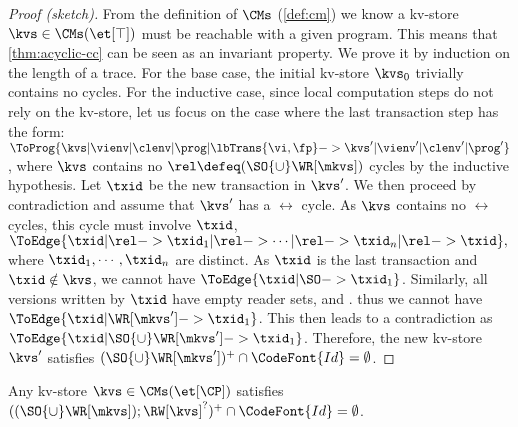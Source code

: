 \begin{proof}[Proof (sketch)]
From the definition of \( \CMs \) (\cref{def:cm})
we know a kv-store \( \kvs \in \CMs(\et[\top]) \) must be reachable with a given program.
This means that \cref{thm:acyclic-cc} can be seen as an invariant property.
We prove it by induction on the length of a trace.
For the base case, the initial kv-store \( \kvs_0 \) trivially contains no cycles.
For the inductive case, since local computation steps do not rely on the kv-store,
let us focus on the case where the last transaction step has the form:
\( \ToProg{\kvs | \vienv | \clenv | \prog | \lbTrans{\vi,\fp} -> \kvs' | \vienv' | \clenv' | \prog' } \),
where \( \kvs \) contains no \(\rel \defeq (\SO {\cup} \WR[\mkvs]) \) cycles by the inductive hypothesis.
Let \( \txid \) be the new transaction in \( \kvs' \).
We then proceed by contradiction and assume that \( \kvs' \) has a $\rel$ cycle.
As $\kvs$ contains no $\rel$ cycles, this cycle must involve  \( \txid \), \ie
\(
\ToEdge{\txid | \rel -> \txid_1 | \rel -> \cdots | \rel -> \txid_n | \rel -> \txid}, 
\)
where  \( \txid_1, \cdots,  \txid_n \) are distinct.
As \( \txid \) is the last transaction and \( \txid \notin \kvs\),
we cannot have \( \ToEdge{\txid | \SO -> \txid_1} \).
Similarly, all versions written by \( \txid \) have empty reader sets, and .
thus we cannot have \( \ToEdge{\txid | \WR[\mkvs'] -> \txid_1} \).
This then leads to a contradiction as \( \ToEdge{\txid | {\SO {\cup} \WR[\mkvs']} -> \txid_1} \).
Therefore, the new kv-store \( \kvs' \) satisfies \( (\SO {\cup} \WR[\mkvs'])^{+} \cap \CodeFont{Id} = \emptyset \).
\renewcommand{\qed}{}
\end{proof}
\SpaceAboveDef
\begin{theorem}
\label{thm:acyclic-cp}
Any kv-store \( \kvs \in \CMs(\et[\CP]) \) satisfies \( ((\SO {\cup} \WR[\mkvs]) ; \RW[\kvs]^? )^{+}  \cap \CodeFont{Id} = \emptyset \).
\end{theorem}
